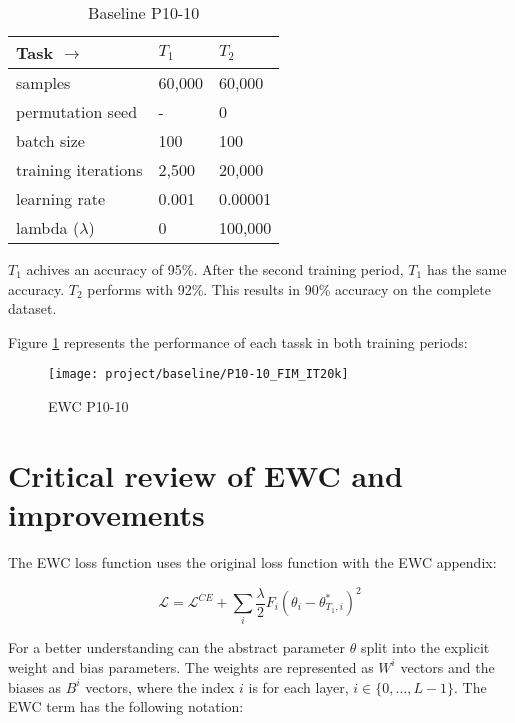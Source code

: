 \begin{table}[H]
    \centering
    \begin{tabular}{ |l|l|l| }
        \hline
        Task $\to$ & $T_1$ & $T_2$ \\
        \hline\hline
        samples & 60,000 & 60,000 \\
        \hline
        permutation seed & - & 0 \\
        \hline
        batch size & 100 & 100 \\
        \hline
        training iterations & 2,500 & 20,000 \\
        \hline
        learning rate & 0.001 & 0.00001 \\
        \hline
        lambda ($\lambda$) & 0 & 100,000 \\
        \hline
    \end{tabular}
    \caption{Baseline P10-10}
    \label{table:base_p1010}
\end{table}

$T_1$ achives an accuracy of 95\%.
After the second training period, $T_1$ has the same accuracy.
$T_2$ performs with 92\%.
This results in 90\% accuracy on the complete dataset.

Figure \ref{fig:ewc_p10-10} represents the performance of each tassk in both training periods:

\begin{figure}[H]
    \centering
    \texttt{[image: project/baseline/P10-10\_FIM\_IT20k]}
    \caption{EWC P10-10}
    \label{fig:ewc_p10-10}
\end{figure}

\newpage

\section{Critical review of EWC and improvements}
\label{project_review_improvements}

The EWC loss function uses the original loss function with the EWC appendix:

\begin{equation}
    \mathcal{L} = 
    \mathcal{L}^{CE} 
    + \sum_{i} 
        \frac{\lambda}{2} 
        F_{i} 
        (\theta_{i} - \theta_{T_1,i}^{*})^2
\end{equation}

For a better understanding can the abstract parameter $\theta$ split into the explicit weight and bias parameters.
The weights are represented as $W^i$ vectors and the biases as $B^i$ vectors, where the index $i$ is for each layer, $i \in \{ 0, \dots, L-1 \}$.
The EWC term has the following notation:

